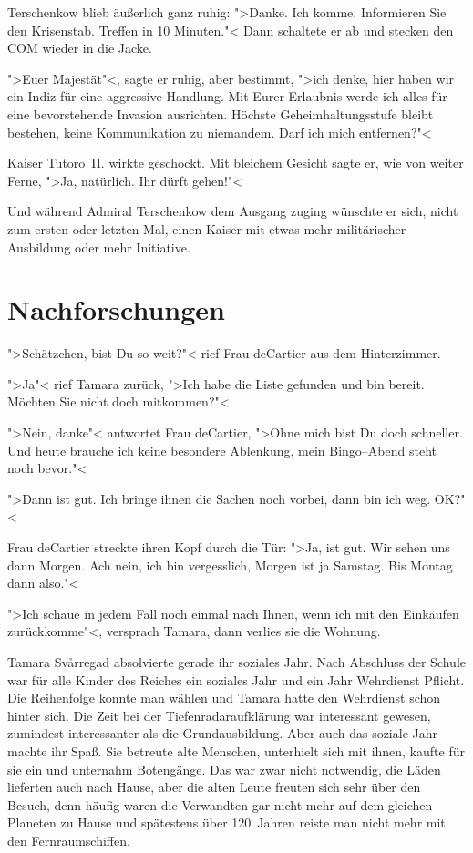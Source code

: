 \documentclass[11pt,twoside,openany]{scrbook}
\begin{document}
Terschenkow blieb äußerlich ganz ruhig: ">Danke. Ich komme. Informieren Sie den Krisenstab. Treffen in 10 Minuten."< Dann schaltete er ab und stecken den COM wieder in die Jacke.

">Euer Majestät"<, sagte er ruhig, aber bestimmt, ">ich denke, hier haben wir ein Indiz für eine aggressive Handlung. Mit Eurer Erlaubnis werde ich alles für eine bevorstehende Invasion ausrichten. Höchste Geheimhaltungsstufe bleibt bestehen, keine Kommunikation zu niemandem. Darf ich mich entfernen?"<

Kaiser Tutoro~II. wirkte geschockt. Mit bleichem Gesicht sagte er, wie von weiter Ferne, ">Ja, natürlich. Ihr dürft gehen!"<

Und während Admiral Terschenkow dem Ausgang zuging wünschte er sich, nicht zum ersten oder letzten Mal, einen Kaiser mit etwas mehr militärischer Ausbildung oder mehr Initiative.

\chapter{Nachforschungen}

">Schätzchen, bist Du so weit?"< rief Frau deCartier aus dem Hinterzimmer.

">Ja"< rief Tamara zurück, ">Ich habe die Liste gefunden und bin bereit. Möchten Sie nicht doch mitkommen?"<

">Nein, danke"< antwortet Frau deCartier, ">Ohne mich bist Du doch schneller. Und heute brauche ich keine besondere Ablenkung, mein Bingo--Abend steht noch bevor."<

">Dann ist gut. Ich bringe ihnen die Sachen noch vorbei, dann bin ich weg. OK?"<

Frau deCartier streckte ihren Kopf durch die Tür: ">Ja, ist gut. Wir sehen uns dann Morgen. Ach nein, ich bin vergesslich, Morgen ist ja Samstag. Bis Montag dann also."<

">Ich schaue in jedem Fall noch einmal nach Ihnen, wenn ich mit den Einkäufen zurückkomme"<, versprach Tamara, dann verlies sie die Wohnung.

Tamara Svårregad absolvierte gerade ihr soziales Jahr. Nach Abschluss der Schule war für alle Kinder des Reiches ein soziales Jahr und ein Jahr Wehrdienst Pflicht. Die Reihenfolge konnte man wählen und Tamara hatte den Wehrdienst schon hinter sich. Die Zeit bei der Tiefenradaraufklärung war interessant gewesen, zumindest interessanter als die Grundausbildung. Aber auch das soziale Jahr machte ihr Spaß. Sie betreute alte Menschen, unterhielt sich mit ihnen, kaufte für sie ein und unternahm Botengänge. Das war zwar nicht notwendig, die Läden lieferten auch nach Hause, aber die alten Leute freuten sich sehr über den Besuch, denn häufig waren die Verwandten gar nicht mehr auf dem gleichen Planeten zu Hause und spätestens über 120~Jahren reiste man nicht mehr mit den Fernraumschiffen.
\end{document}

